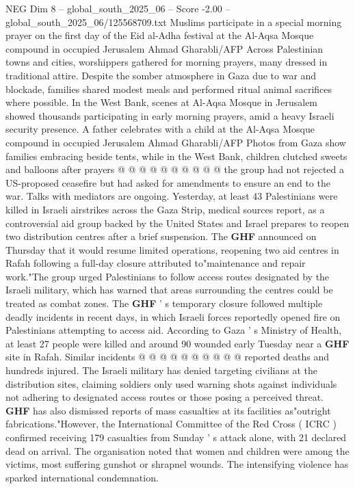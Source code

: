 \begin{textsample}{NEG Dim 8 – global\_south\_2025\_06 – Score -2.00 – global\_south\_2025\_06/125568709.txt}
Muslims participate in a special morning prayer on the first day of the Eid al-Adha festival at the Al-Aqsa Mosque compound in occupied Jerusalem Ahmad Gharabli/AFP Across Palestinian towns and cities, worshippers gathered for morning prayers, many dressed in traditional attire.
Despite the somber atmosphere in Gaza due to war and blockade, families shared modest meals and performed ritual animal sacrifices where possible.
In the West Bank, scenes at Al-Aqsa Mosque in Jerusalem showed thousands participating in early morning prayers, amid a heavy Israeli security presence.
A father celebrates with a child at the Al-Aqsa Mosque compound in occupied Jerusalem Ahmad Gharabli/AFP Photos from Gaza show families embracing beside tents, while in the West Bank, children clutched sweets and balloons after prayers @ @ @ @ @ @ @ @ @ @ the group had not rejected a US-proposed ceasefire but had asked for amendments to ensure an end to the war.
Talks with mediators are ongoing.
Yesterday, at least 43 Palestinians were killed in Israeli airstrikes across the Gaza Strip, medical sources report, as a controversial aid group backed by the United States and Israel prepares to reopen two distribution centres after a brief suspension.
The \textbf{GHF} announced on Thursday that it would resume limited operations, reopening two aid centres in Rafah following a full-day closure attributed to"maintenance and repair work."The group urged Palestinians to follow access routes designated by the Israeli military, which has warned that areas surrounding the centres could be treated as combat zones.
The \textbf{GHF} ' s temporary closure followed multiple deadly incidents in recent days, in which Israeli forces reportedly opened fire on Palestinians attempting to access aid.
According to Gaza ' s Ministry of Health, at least 27 people were killed and around 90 wounded early Tuesday near a \textbf{GHF} site in Rafah.
Similar incidents @ @ @ @ @ @ @ @ @ @ reported deaths and hundreds injured.
The Israeli military has denied targeting civilians at the distribution sites, claiming soldiers only used warning shots against individuals not adhering to designated access routes or those posing a perceived threat. \textbf{GHF} has also dismissed reports of mass casualties at its facilities as"outright fabrications."However, the International Committee of the Red Cross ( ICRC ) confirmed receiving 179 casualties from Sunday ' s attack alone, with 21 declared dead on arrival.
The organisation noted that women and children were among the victims, most suffering gunshot or shrapnel wounds.
The intensifying violence has sparked international condemnation.

\end{textsample}
